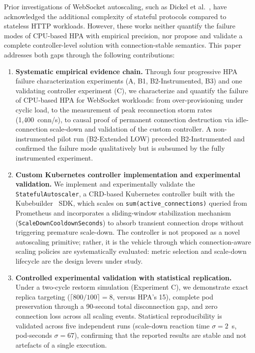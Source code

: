 \documentclass[twocolumn]{svjour3}
\begin{document}
Prior investigations of WebSocket autoscaling, such as Dickel et al.~\cite{dickel2019stateful}, have acknowledged the additional complexity of stateful protocols compared to stateless HTTP workloads. However, these works neither quantify the failure modes of CPU-based HPA with empirical precision, nor propose and validate a complete controller-level solution with connection-stable semantics. This paper addresses both gaps through the following contributions:

\begin{enumerate}[leftmargin=*]
\item \textbf{Systematic empirical evidence chain.} Through four progressive HPA failure characterization experiments (A, B1, B2-Instrumented, B3) and one validating controller experiment (C), we characterize and quantify the failure of CPU-based HPA for WebSocket workloads: from over-provisioning under cyclic load, to the measurement of peak reconnection storm rates (1,400~conn/s), to causal proof of permanent connection destruction via idle-connection scale-down and validation of the custom controller. A non-instrumented pilot run (B2-Extended LOW) preceded B2-Instrumented and confirmed the failure mode qualitatively but is subsumed by the fully instrumented experiment.

\item \textbf{Custom Kubernetes controller implementation and experimental validation.} We implement and experimentally validate the \texttt{StatefulAutoscaler}, a CRD-based Kubernetes controller built with the Kubebuilder~\cite{kubebuilder_docs} SDK, which scales on \texttt{sum(active\_connections)} queried from Prometheus and incorporates a sliding-window stabilization mechanism (\texttt{ScaleDownCooldownSeconds}) to absorb transient connection drops without triggering premature scale-down. The controller is not proposed as a novel autoscaling primitive; rather, it is the vehicle through which connection-aware scaling policies are systematically evaluated: metric selection and scale-down lifecycle are the design levers under study.

\item \textbf{Controlled experimental validation with statistical replication.} Under a two-cycle restorm simulation (Experiment C), we demonstrate exact replica targeting ($\lceil800/100\rceil = 8$, versus HPA's 15), complete pod preservation through a 90-second total disconnection gap, and zero connection loss across all scaling events. Statistical reproducibility is validated across five independent runs (scale-down reaction time $\sigma = 2$~s, pod-seconds $\sigma = 67$), confirming that the reported results are stable and not artefacts of a single execution.


\end{enumerate}
\end{document}
